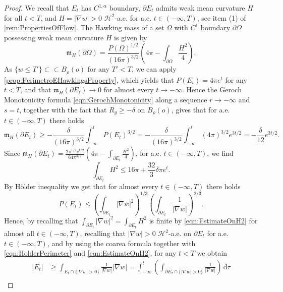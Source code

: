 \documentclass[a4paper,12pt,reqno]{amsart}
\numberwithin{equation}{section}
\theoremstyle{plain}
\theoremstyle{definition}
\theoremstyle{remark}
\newcommand{\haus}{\mathcal{H}}
\newcommand{\de}{\ensuremath{\,\mathrm d}} %
\begin{document}
{\begin{proof}
We recall that $E_t$ has $C^{1,\alpha}$ boundary, $\partial E_t$ admits weak mean curvature $H$ for all $t<T$, and $H=|\nabla w|>0$ $\haus^2$-a.e. for a.e. $t\in(-\infty,T)$, see item (1) of \cref{rem:PropertiesOfFlow}.
The Hawking mass of a set $\Omega$ with $C^1$ boundary $\partial\Omega$ possessing weak mean curvature $H$ is given by
\[
\mathfrak{m}_H(\partial\Omega)=\frac{P(\Omega)^{1/2}}{(16\pi)^{3/2}}\left(4\pi-\int_{\partial\Omega}\frac{H^2}{4}\right).
\]
As $\{w \le T'\} \subset \subset B_\rho(o)$ for any $T'<T$, we can apply \cref{prop:PerimetroEHawkingsProperty}, which yields that $P( E_t)=4\pi e^t$ for any $t<T$, and that $\mathfrak{m}_H(\partial E_t)\to 0$ for almost every $t\to-\infty$.
Hence the Geroch Monotonicity formula \eqref{eqn:GerochMonotonicity} along a sequence $r\to-\infty$ and $s=t$, together with the fact that $R_g\geq -\delta$ on $B_\rho(o)$, gives that for a.e. $t\in (-\infty, T)$ there holds
    \[
    \mathfrak{m}_H(\partial E_t)\geq -\frac{\delta}{(16\pi)^{3/2}}\int_{-\infty}^t P(E_t)^{3/2}=-\frac{\delta}{(16\pi)^{3/2}}\int_{-\infty}^t(4\pi)^{3/2}e^{3t/2}=-\frac{\delta}{12}e^{3t/2}.
    \]
    Since $\mathfrak{m}_H(\partial E_t) = \frac{2\pi^{1/2}e^{t/2}}{64\pi^{3/2}}\left(4\pi-\int_{\partial E_t}\frac{H^2}{4}\right)$, for a.e. $t\in (-\infty,T)$, we find
\begin{equation}\label{eqn:EstimateOnH2}
     \int_{\partial E_t} H^2\leq 16\pi + \frac{32}{3}\delta\pi e^t.
\end{equation}
    By H\"older inequality we get that for almost every $t\in (-\infty,T)$ there holds
    \begin{equation}\label{eqn:HolderPerimeter}
    P(E_t)\leq \left(\int_{\partial E_t}|\nabla w|^2\right)^{1/3}\left(\int_{\partial E_t}\frac{1}{|\nabla w|}\right)^{2/3}.
    \end{equation}
    Hence, by recalling that $\int_{\partial E_t}|\nabla w|^2=\int_{\partial E_t} H^2$ is finite by \eqref{eqn:EstimateOnH2} for almost all $t\in (-\infty,T)$, recalling that $|\nabla w|>0$ $\haus^2$-a.e. on $\partial E_t$ for a.e. $t \in (-\infty,T)$, and by using the coarea formula together with \eqref{eqn:HolderPerimeter} and \eqref{eqn:EstimateOnH2}, for any $t<T$ we obtain
    \begin{equation}
    \begin{split}
    \label{eq:chainreverse}
        |E_t| &\geq \int_{E_t\cap\{|\nabla w|>0\}} \frac{1}{|\nabla w|}|\nabla w| = \int_{-\infty}^t \left(\int_{\partial E_\tau\cap\{|\nabla w|>0\}} \frac{1}{|\nabla w|}\right)\de\tau \\

\end{split}
\end{equation}
\end{proof}}
\end{document}
